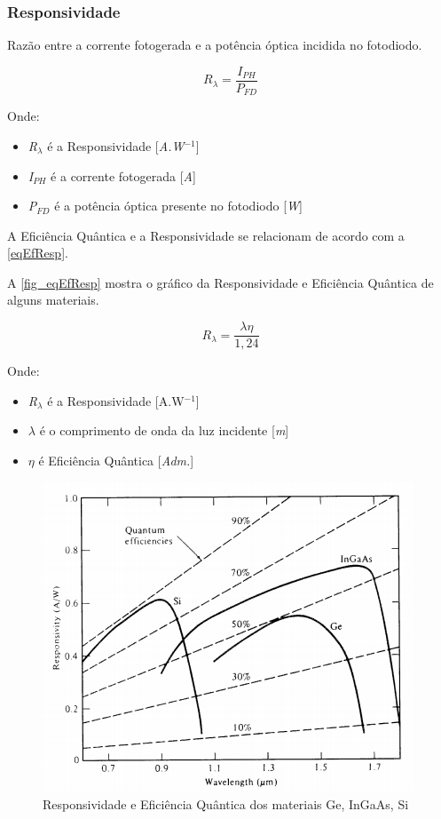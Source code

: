 \subsubsection{Responsividade}
Razão entre a corrente fotogerada e a potência óptica incidida no fotodiodo.

\begin{equation}
    \label{eq_responsividade}
    R_\lambda = \frac{I_{PH}}{P_{FD}}
\end{equation}

Onde:
\begin{itemize}
    \item \textit{R$_\lambda$} \'e a Responsividade [\textit{A.W$^{-1}$}]
    \item \textit{I$_{PH}$} \'e a corrente fotogerada [\textit{A}]
    \item \textit{P$_{FD}$} \'e a potência \'optica presente no fotodiodo [\textit{W}]
\end{itemize}

A Eficiência Quântica e a Responsividade se relacionam de acordo com a \autoref{eqEfResp}.

A \autoref{fig_eqEfResp} mostra o gráfico da Responsividade e Efici\^encia Qu\^antica de alguns materiais.

\begin{equation}
    \label{eqEfResp}
    R_\lambda = \frac{\lambda\eta}{1,24}
\end{equation}

Onde:
\begin{itemize}
    \item \textit{R$_\lambda$} \'e a Responsividade [A.W$^{-1}$]
    \item $\lambda$ \'e o comprimento de onda da luz incidente [\textit{m}]
    \item $\eta$ \'e Efici\^encia Qu\^antica [\textit{Adm.}]
\end{itemize}

\begin{figure}[htb]
	\caption{\label{fig_responsividade}Responsividade e Efici\^encia Qu\^antica dos materiais Ge, InGaAs, Si}
	\begin{center}
	    \includegraphics[scale=0.5]{Imagens/GraficoRespostaEspectral.png}
	\end{center}
	\label{fig_eqEfResp}
\end{figure}


